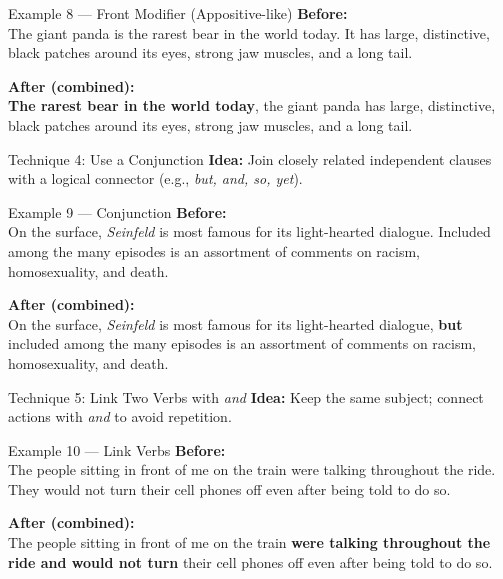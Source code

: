 \documentclass[aspectratio=169,11pt]{beamer}
\begin{document}
\begin{frame}{Example 8 — Front Modifier (Appositive-like)}
\small
\textbf{Before:}\\
The giant panda is the rarest bear in the world today. It has large, distinctive, black patches around its eyes, strong jaw muscles, and a long tail.

\vspace{0.5em}
\textbf{After (combined):}\\
\textbf{The rarest bear in the world today}, the giant panda has large, distinctive, black patches around its eyes, strong jaw muscles, and a long tail.
\end{frame}

\begin{frame}{Technique 4: Use a Conjunction}
\small
\textbf{Idea:} Join closely related independent clauses with a logical connector (e.g., \emph{but, and, so, yet}).
\end{frame}

\begin{frame}{Example 9 — Conjunction}
\small
\textbf{Before:}\\
On the surface, \textit{Seinfeld} is most famous for its light-hearted dialogue. Included among the many episodes is an assortment of comments on racism, homosexuality, and death.

\vspace{0.5em}
\textbf{After (combined):}\\
On the surface, \textit{Seinfeld} is most famous for its light-hearted dialogue, \textbf{but} included among the many episodes is an assortment of comments on racism, homosexuality, and death.
\end{frame}

\begin{frame}{Technique 5: Link Two Verbs with \emph{and}}
\small
\textbf{Idea:} Keep the same subject; connect actions with \emph{and} to avoid repetition.
\end{frame}

\begin{frame}{Example 10 — Link Verbs}
\small
\textbf{Before:}\\
The people sitting in front of me on the train were talking throughout the ride. They would not turn their cell phones off even after being told to do so.

\vspace{0.5em}
\textbf{After (combined):}\\
The people sitting in front of me on the train \textbf{were talking throughout the ride and would not turn} their cell phones off even after being told to do so.
\end{frame}
\end{document}
